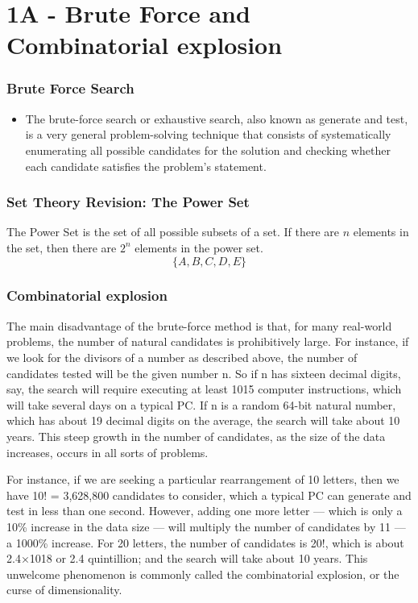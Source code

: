 \documentclass{beamer}
\begin{document}
\section{1A - Brute Force and Combinatorial explosion}
\begin{frame}
\frametitle{Brute Force Search}
\begin{itemize}
\item The brute-force search or exhaustive search, also known as generate and test, is a very general problem-solving technique that consists of systematically enumerating all possible candidates for the solution and checking whether each candidate satisfies the problem's statement.
\end{itemize}
\end{frame}


\begin{frame}
\frametitle{Set Theory Revision: The Power Set}
The Power Set is the set of all possible subsets of a set. If there are $n$ elements in the set, then there are $2^n$ elements in the power set.
\[ \{A,B,C,D,E\}\]
\end{frame}


\begin{frame}
\frametitle{Combinatorial explosion}
The main disadvantage of the brute-force method is that, for many real-world problems, the number of natural candidates is prohibitively large. For instance, if we look for the divisors of a number as described above, the number of candidates tested will be the given number n. So if n has sixteen decimal digits, say, the search will require executing at least 1015 computer instructions, which will take several days on a typical PC. If n is a random 64-bit natural number, which has about 19 decimal digits on the average, the search will take about 10 years. This steep growth in the number of candidates, as the size of the data increases, occurs in all sorts of problems. 
\end{frame}


\begin{frame}
For instance, if we are seeking a particular rearrangement of 10 letters, then we have 10! = 3,628,800 candidates to consider, which a typical PC can generate and test in less than one second. However, adding one more letter — which is only a 10\% increase in the data size — will multiply the number of candidates by 11 — a 1000\% increase. For 20 letters, the number of candidates is 20!, which is about 2.4×1018 or 2.4 quintillion; and the search will take about 10 years. This unwelcome phenomenon is commonly called the combinatorial explosion, or the curse of dimensionality.
\end{frame}
\end{document}
